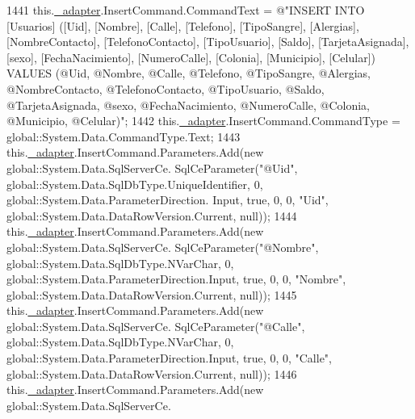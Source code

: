 \begin{DoxyCode}
1441             this.\hyperlink{class_proyecto___integrador__3_1_1ds_usuarios_table_adapters_1_1_usuarios_table_adapter_ab48b9b83ce2db01dbbc83ad45b428a80}{\_adapter}.InsertCommand.CommandText = \textcolor{stringliteral}{@"INSERT INTO [Usuarios] ([Uid], [Nombre],
       [Calle], [Telefono], [TipoSangre], [Alergias], [NombreContacto], [TelefonoContacto], [TipoUsuario], [Saldo],
       [TarjetaAsignada], [sexo], [FechaNacimiento], [NumeroCalle], [Colonia], [Municipio], [Celular]) VALUES (@Uid,
       @Nombre, @Calle, @Telefono, @TipoSangre, @Alergias, @NombreContacto, @TelefonoContacto, @TipoUsuario,
       @Saldo, @TarjetaAsignada, @sexo, @FechaNacimiento, @NumeroCalle, @Colonia, @Municipio, @Celular)"};
1442             this.\hyperlink{class_proyecto___integrador__3_1_1ds_usuarios_table_adapters_1_1_usuarios_table_adapter_ab48b9b83ce2db01dbbc83ad45b428a80}{\_adapter}.InsertCommand.CommandType = global::System.Data.CommandType.Text;
1443             this.\hyperlink{class_proyecto___integrador__3_1_1ds_usuarios_table_adapters_1_1_usuarios_table_adapter_ab48b9b83ce2db01dbbc83ad45b428a80}{\_adapter}.InsertCommand.Parameters.Add(\textcolor{keyword}{new} global::System.Data.SqlServerCe.
      SqlCeParameter(\textcolor{stringliteral}{"@Uid"}, global::System.Data.SqlDbType.UniqueIdentifier, 0, global::System.Data.ParameterDirection.
      Input, \textcolor{keyword}{true}, 0, 0, \textcolor{stringliteral}{"Uid"}, global::System.Data.DataRowVersion.Current, null));
1444             this.\hyperlink{class_proyecto___integrador__3_1_1ds_usuarios_table_adapters_1_1_usuarios_table_adapter_ab48b9b83ce2db01dbbc83ad45b428a80}{\_adapter}.InsertCommand.Parameters.Add(\textcolor{keyword}{new} global::System.Data.SqlServerCe.
      SqlCeParameter(\textcolor{stringliteral}{"@Nombre"}, global::System.Data.SqlDbType.NVarChar, 0, global::System.Data.ParameterDirection.Input, \textcolor{keyword}{
      true}, 0, 0, \textcolor{stringliteral}{"Nombre"}, global::System.Data.DataRowVersion.Current, null));
1445             this.\hyperlink{class_proyecto___integrador__3_1_1ds_usuarios_table_adapters_1_1_usuarios_table_adapter_ab48b9b83ce2db01dbbc83ad45b428a80}{\_adapter}.InsertCommand.Parameters.Add(\textcolor{keyword}{new} global::System.Data.SqlServerCe.
      SqlCeParameter(\textcolor{stringliteral}{"@Calle"}, global::System.Data.SqlDbType.NVarChar, 0, global::System.Data.ParameterDirection.Input, \textcolor{keyword}{
      true}, 0, 0, \textcolor{stringliteral}{"Calle"}, global::System.Data.DataRowVersion.Current, null));
1446             this.\hyperlink{class_proyecto___integrador__3_1_1ds_usuarios_table_adapters_1_1_usuarios_table_adapter_ab48b9b83ce2db01dbbc83ad45b428a80}{\_adapter}.InsertCommand.Parameters.Add(\textcolor{keyword}{new} global::System.Data.SqlServerCe.

\end{DoxyCode}
